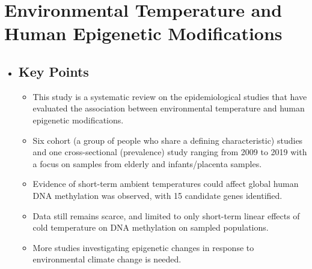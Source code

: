 \documentclass[basic]{inVerba-notes}
\begin{document}
\section{\large{Environmental Temperature and Human Epigenetic Modifications}}
\begin{itemize}
  \item []
  \subsection{Key Points}
  \begin{itemize}
      \item This study is a systematic review on the epidemiological studies that have evaluated the association between environmental temperature and human epigenetic modifications.
      \item Six cohort (a group of people who share a defining characteristic) studies and one cross-sectional (prevalence) study ranging from 2009 to 2019 with a focus on samples from elderly and infants/placenta samples.
      \item Evidence of short-term ambient temperatures could affect global human DNA methylation was observed, with 15 candidate genes identified.
      \item Data still remains scarce, and limited to only short-term linear effects of cold temperature on DNA methylation on sampled populations.
      \item More studies investigating epigenetic changes in response to environmental climate change is needed.
  \end{itemize}


\end{itemize}
\end{document}
